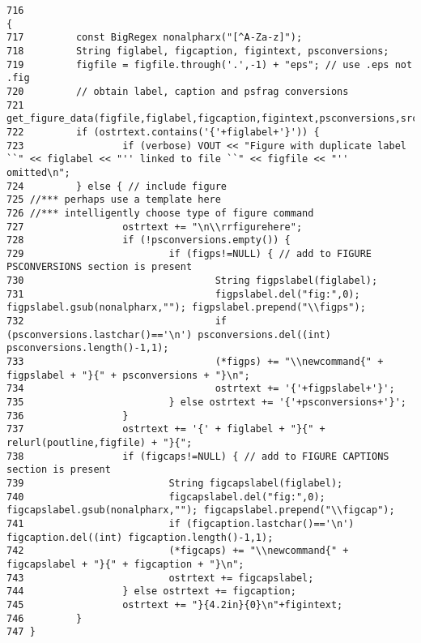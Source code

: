 \footnotesize\begin{verbatim}716                                                                                                                                                                               {
717         const BigRegex nonalpharx("[^A-Za-z]");
718         String figlabel, figcaption, figintext, psconversions;
719         figfile = figfile.through('.',-1) + "eps"; // use .eps not .fig
720         // obtain label, caption and psfrag conversions
721         get_figure_data(figfile,figlabel,figcaption,figintext,psconversions,srcf,srcfname,srcfnum);
722         if (ostrtext.contains('{'+figlabel+'}')) {
723                 if (verbose) VOUT << "Figure with duplicate label ``" << figlabel << "'' linked to file ``" << figfile << "'' omitted\n";
724         } else { // include figure
725 //*** perhaps use a template here
726 //*** intelligently choose type of figure command
727                 ostrtext += "\n\\rrfigurehere";
728                 if (!psconversions.empty()) {
729                         if (figps!=NULL) { // add to FIGURE PSCONVERSIONS section is present
730                                 String figpslabel(figlabel);
731                                 figpslabel.del("fig:",0); figpslabel.gsub(nonalpharx,""); figpslabel.prepend("\\figps");
732                                 if (psconversions.lastchar()=='\n') psconversions.del((int) psconversions.length()-1,1);
733                                 (*figps) += "\\newcommand{" + figpslabel + "}{" + psconversions + "}\n";
734                                 ostrtext += '{'+figpslabel+'}';
735                         } else ostrtext += '{'+psconversions+'}';
736                 }
737                 ostrtext += '{' + figlabel + "}{" + relurl(poutline,figfile) + "}{";
738                 if (figcaps!=NULL) { // add to FIGURE CAPTIONS section is present
739                         String figcapslabel(figlabel);
740                         figcapslabel.del("fig:",0); figcapslabel.gsub(nonalpharx,""); figcapslabel.prepend("\\figcap");
741                         if (figcaption.lastchar()=='\n') figcaption.del((int) figcaption.length()-1,1);
742                         (*figcaps) += "\\newcommand{" + figcapslabel + "}{" + figcaption + "}\n";
743                         ostrtext += figcapslabel;
744                 } else ostrtext += figcaption;
745                 ostrtext += "}{4.2in}{0}\n"+figintext;
746         }
747 }
\end{verbatim}\normalsize 
{}
